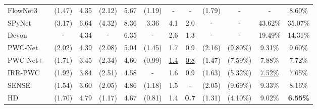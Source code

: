 \documentclass[runningheads]{llncs}
\begin{document}
\begin{table*}[t]
{\begin{tabular}{|l|c c|c c|c c c|c c c c|}
\multirow{1}{*}{FlowNet3~\cite{Ilg18}}				
&(1.47)&\multicolumn{1}{c|}{4.35}	           
&(2.12)&\multicolumn{1}{c|}{5.67}
&(1.19)&\multicolumn{1}{c}{-}&\multicolumn{1}{c|}{-}
&(1.79)&\multicolumn{1}{c}{-}&\multicolumn{1}{c}{-}&\multicolumn{1}{c|}{8.60\%}\\ 

\multirow{1}{*}{SPyNet~\cite{Ranjan17}}				
&(3.17)&\multicolumn{1}{c|}{6.64}	           
&(4.32)&\multicolumn{1}{c|}{8.36}
&3.36&\multicolumn{1}{c}{4.1}&\multicolumn{1}{c|}{2.0}	
&-&\multicolumn{1}{c}{-}&\multicolumn{1}{c}{43.62\%}&\multicolumn{1}{c|}{35.07\%}	\\  

\multirow{1}{*}{Devon~\cite{Lu20}}				
&-&\multicolumn{1}{c|}{4.34}           
&-&\multicolumn{1}{c|}{6.35}
&-&\multicolumn{1}{c}{2.6}&\multicolumn{1}{c|}{1.3}		
&-&\multicolumn{1}{c}{-}&\multicolumn{1}{c}{19.49\%}&\multicolumn{1}{c|}{14.31\%}\\

\multirow{1}{*}{PWC-Net~\cite{Sun18}}				
&(2.02)&\multicolumn{1}{c|}{4.39}	           
&(2.08)&\multicolumn{1}{c|}{5.04}
&(1.45)&\multicolumn{1}{c}{1.7}&\multicolumn{1}{c|}{0.9}
&(2.16)&\multicolumn{1}{c}{(9.80\%)}&\multicolumn{1}{c}{9.31\%}&\multicolumn{1}{c|}{9.60\%}\\  

\multirow{1}{*}{PWC-Net+~\cite{Sun19}}				
&(1.71)&\multicolumn{1}{c|}{3.45}          
&(2.34)&\multicolumn{1}{c|}{4.60}
&(0.99)&\multicolumn{1}{c}{\underline{1.4}}&\multicolumn{1}{c|}{\underline{0.8}}	
&(1.47)&\multicolumn{1}{c}{(7.59\%)}&\multicolumn{1}{c}{7.88\%}&\multicolumn{1}{c|}{7.72\%}\\ 
 
\multirow{1}{*}{IRR-PWC~\cite{Hur19}}				
&(1.92)&\multicolumn{1}{c|}{3.84}           
&(2.51)&\multicolumn{1}{c|}{4.58}
&-&\multicolumn{1}{c}{1.6}&\multicolumn{1}{c|}{0.9}		
&(1.63)&\multicolumn{1}{c}{(5.32\%)}&\multicolumn{1}{c}{\underline{7.52\%}}&\multicolumn{1}{c|}{7.65\%}\\
                               
\multirow{1}{*}{SENSE~\cite{Jiang19}}				
&(1.54)&\multicolumn{1}{c|}{3.60}           
&(2.05)&\multicolumn{1}{c|}{4.86}
&(1.18)&\multicolumn{1}{c}{1.5}&\multicolumn{1}{c|}{-}		
&(2.05)&\multicolumn{1}{c}{(9.69\%)}&\multicolumn{1}{c}{9.33\%}&\multicolumn{1}{c|}{8.16\%}\\
                                                          
\multirow{1}{*}{HD~\cite{Yin19}}				
&(1.70)&\multicolumn{1}{c|}{4.79}           
&(1.17)&\multicolumn{1}{c|}{4.67}
&(0.81)&\multicolumn{1}{c}{1.4}&\multicolumn{1}{c|}{\textbf{0.7}}		
&(1.31)&\multicolumn{1}{c}{(4.10\%)}&\multicolumn{1}{c}{9.02\%}&\multicolumn{1}{c|}{\textbf{6.55\%}}\\


\end{tabular}}
\end{table*}
\end{document}

